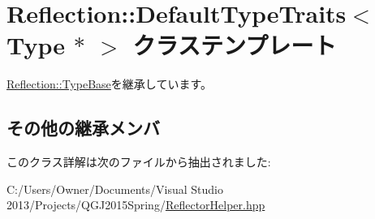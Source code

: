 \hypertarget{class_reflection_1_1_default_type_traits_3_01_type_01_5_01_4}{}\section{Reflection\+:\+:Default\+Type\+Traits$<$ Type $\ast$ $>$ クラステンプレート}
\label{class_reflection_1_1_default_type_traits_3_01_type_01_5_01_4}


\hyperlink{class_reflection_1_1_type_base}{Reflection\+::\+Type\+Base}を継承しています。

\subsection*{その他の継承メンバ}


このクラス詳解は次のファイルから抽出されました\+:\begin{DoxyCompactItemize}
\item 
C\+:/\+Users/\+Owner/\+Documents/\+Visual Studio 2013/\+Projects/\+Q\+G\+J2015\+Spring/\hyperlink{_reflector_helper_8hpp}{Reflector\+Helper.\+hpp}\end{DoxyCompactItemize}
